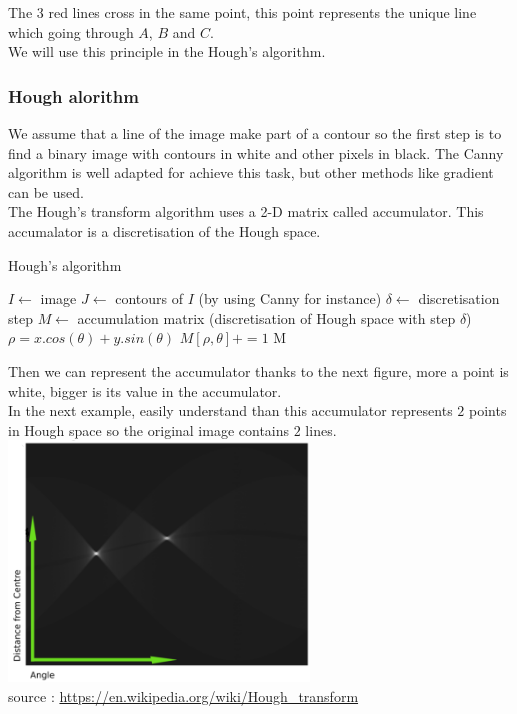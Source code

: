 \documentclass{article}
\begin{document}
The 3 red lines cross in the same point, this point represents the unique line which going through $A$, $B$ and $C$.\\
We will use this principle in the Hough's algorithm.

\subsubsection{Hough alorithm}

We assume that a line of the image make part of a contour so the first step is to find a binary image with contours in white and other pixels in black. The Canny algorithm is well adapted for achieve this task, but other methods like gradient can be used.\\

The Hough's transform algorithm uses a 2-D matrix called accumulator. This accumalator is a discretisation of the Hough space.

\begin{algorithm}
\caption{Hough's algorithm}
\begin{algorithmic} 
\STATE $I \leftarrow $ image
\STATE $J \leftarrow $ contours of $I$ (by using Canny for instance)
\STATE $\delta \leftarrow $ discretisation step
\STATE $M \leftarrow $ accumulation matrix (discretisation of Hough space with step $\delta$)
\STATE $\rho = x.cos(\theta) + y.sin(\theta)$
\STATE $M[\rho, \theta] += 1$
\ENDFOR
\ENDFOR
\RETURN M
\end{algorithmic}
\end{algorithm}

Then we can represent the accumulator thanks to the next figure, more a point is white, bigger is its value in the accumulator.\\

In the next example, easily understand than this accumulator represents $2$ points in Hough space so the original image contains $2$ lines.\\

\includegraphics[width=8cm]{images/img20.png}\\
source : \url{https://en.wikipedia.org/wiki/Hough_transform} \\
\end{document}
